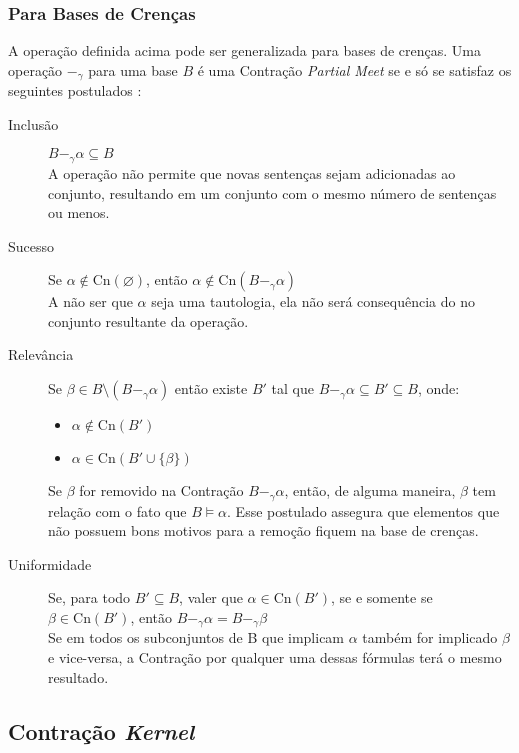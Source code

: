 \subsubsection{Para Bases de Crenças}

A operação definida acima pode ser generalizada para bases de crenças. Uma operação $ -_{\gamma} $ para uma base $ B $ é uma Contração \textit{Partial Meet} se e só se satisfaz os seguintes postulados \citep{revisaoHansson2}:

\begin{description}
	\item[Inclusão] $ B -_{\gamma} \alpha \subseteq B$ \\ A operação não permite que novas sentenças sejam adicionadas ao conjunto, resultando em um conjunto com o mesmo número de sentenças ou menos.
	\item[Sucesso] Se $ \alpha \notin \text{Cn}(\varnothing) $, então $ \alpha \notin \text{Cn}(B -_{\gamma} \alpha) $ \\ A não ser que $ \alpha $ seja uma tautologia, ela não será consequência do no conjunto resultante da operação.
	\item[Relevância] Se $ \beta \in B \setminus (B -_{\gamma} \alpha) $ então existe  $ B' $ tal que $B -_{\gamma} \alpha \subseteq B' \subseteq B $, onde:
	\begin{itemize}
		\item $ \alpha \notin \text{Cn}(B') $
		\item $ \alpha \in \text{Cn}(B' \cup \{\beta\}) $ 
	\end{itemize}
	Se $ \beta $ for removido na Contração $ B -_{\gamma} \alpha $, então, de alguma maneira, $ \beta $ tem relação com o fato que $ B \models \alpha$. Esse postulado assegura que elementos que não possuem bons motivos para a remoção fiquem na base de crenças.
	\item[Uniformidade] Se, para todo $B' \subseteq B $, valer que $ \alpha \in \text{Cn}(B') $, se e somente se $ \beta \in \text{Cn}(B') $, então $ B -_{\gamma} \alpha = B -_{\gamma} \beta $ \\
	Se em todos os subconjuntos de B que implicam $ \alpha $ também for implicado $ \beta $ e vice-versa, a Contração por qualquer uma dessas fórmulas terá o mesmo resultado.
\end{description}

\subsection{Contração \textit{Kernel}}

